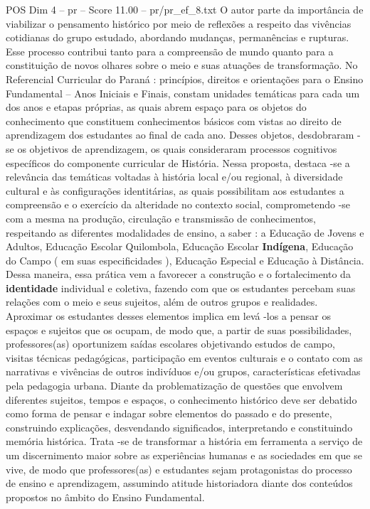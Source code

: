 \begin{textsample}{POS Dim 4 – pr – Score 11.00 – pr/pr\_ef\_8.txt}
O autor parte da importância de viabilizar o pensamento histórico por meio de reflexões a respeito das vivências cotidianas do grupo estudado, abordando mudanças, permanências e rupturas.
Esse processo contribui tanto para a compreensão de mundo quanto para a constituição de novos olhares sobre o meio e suas atuações de transformação.
No Referencial Curricular do Paraná : princípios, direitos e orientações para o Ensino Fundamental – Anos Iniciais e Finais, constam unidades temáticas para cada um dos anos e etapas próprias, as quais abrem espaço para os objetos do conhecimento que constituem conhecimentos básicos com vistas ao direito de aprendizagem dos estudantes ao final de cada ano.
Desses objetos, desdobraram -se os objetivos de aprendizagem, os quais consideraram processos cognitivos específicos do componente curricular de História.
Nessa proposta, destaca -se a relevância das temáticas voltadas à história local e/ou regional, à diversidade cultural e às configurações identitárias, as quais possibilitam aos estudantes a compreensão e o exercício da alteridade no contexto social, comprometendo -se com a mesma na produção, circulação e transmissão de conhecimentos, respeitando as diferentes modalidades de ensino, a saber : a Educação de Jovens e Adultos, Educação Escolar Quilombola, Educação Escolar \textbf{Indígena}, Educação do Campo ( em suas especificidades ), Educação Especial e Educação à Distância.
Dessa maneira, essa prática vem a favorecer a construção e o fortalecimento da \textbf{identidade} individual e coletiva, fazendo com que os estudantes percebam suas relações com o meio e seus sujeitos, além de outros grupos e realidades.
Aproximar os estudantes desses elementos implica em levá -los a pensar os espaços e sujeitos que os ocupam, de modo que, a partir de suas possibilidades, professores(as) oportunizem saídas escolares objetivando estudos de campo, visitas técnicas pedagógicas, participação em eventos culturais e o contato com as narrativas e vivências de outros indivíduos e/ou grupos, características efetivadas pela pedagogia urbana.
Diante da problematização de questões que envolvem diferentes sujeitos, tempos e espaços, o conhecimento histórico deve ser debatido como forma de pensar e indagar sobre elementos do passado e do presente, construindo explicações, desvendando significados, interpretando e constituindo memória histórica.
Trata -se de transformar a história em ferramenta a serviço de um discernimento maior sobre as experiências humanas e as sociedades em que se vive, de modo que professores(as) e estudantes sejam protagonistas do processo de ensino e aprendizagem, assumindo atitude historiadora diante dos conteúdos propostos no âmbito do Ensino Fundamental.

\end{textsample}
